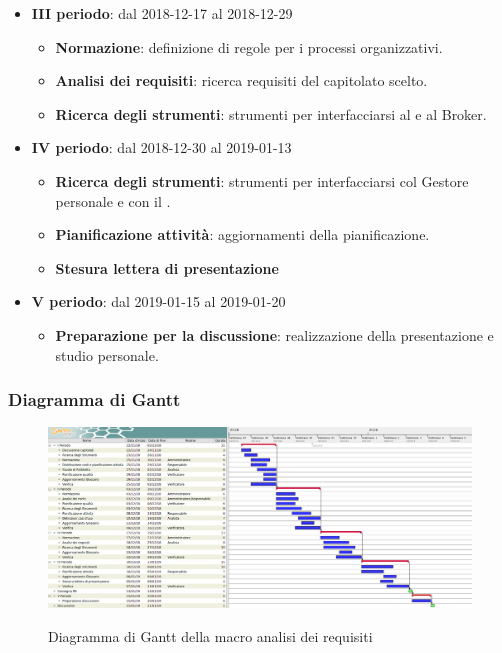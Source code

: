 \begin{itemize}
\begin{itemize}
			\end{itemize}
        	\item \textbf{III periodo}: dal 2018-12-17 al 2018-12-29
			\begin{itemize}
    	        \item \textbf{Normazione}: definizione di regole per i processi organizzativi.
    	        \item \textbf{Analisi dei requisiti}: ricerca requisiti del capitolato scelto.
       	        \item \textbf{Ricerca degli strumenti}: strumenti per interfacciarsi al  e al Broker.
        	\end{itemize}
        	\item \textbf{IV periodo}: dal 2018-12-30 al 2019-01-13
        	\begin{itemize}
       	        \item \textbf{Ricerca degli strumenti}: strumenti per interfacciarsi col Gestore personale e con il .
       	        \item \textbf{Pianificazione attività}: aggiornamenti della pianificazione.
       	        \item \textbf{Stesura lettera di presentazione}
        	\end{itemize}
        	\item \textbf{V periodo}: dal 2019-01-15 al 2019-01-20
        	\begin{itemize}
    	        \item \textbf{Preparazione per la discussione}: realizzazione della presentazione e studio personale.
        	\end{itemize}
		\end{itemize}

        \begin{landscape}
			\subsubsection{Diagramma di Gantt}
			\begin{figure}[H]
					\centering
					\includegraphics[scale=0.4]{img/Analisi_dei_requisiti.png}\\
					\caption{Diagramma di Gantt della macro analisi dei requisiti}
			\end{figure}
		\end{landscape}

